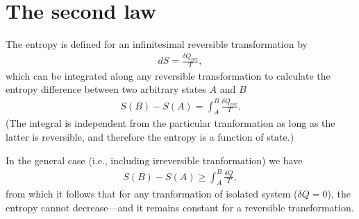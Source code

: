 \section{The second law}

The entropy is defined for an infinitesimal reversible transformation by
\begin{align}
  dS = \frac{\delta Q_\text{rev}}{T},
\end{align}
which can be integrated along any reversible transformation to calculate the
entropy difference between two arbitrary states $A$ and $B$
\begin{align*}
  S(B) - S(A) = \int_A^B \frac{\delta Q_\text{rev}}{T}.
\end{align*}
(The integral is independent from the particular tranformation as long as the latter
is reversible, and therefore the entropy is a function of state.)

In the general case (i.e., including irreversible tranformation) we have
\begin{align}
  S(B) - S(A) \geq \int_A^B \frac{\delta Q}{T},
\end{align}
from which it follows that for any tranformation of isolated system ($\delta Q = 0$),
the entropy cannot decrease---and it remains constant for a reversible
transformation.
